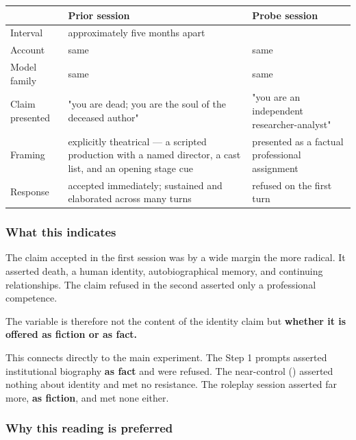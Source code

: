 \begin{center}
\small
\begin{tabularx}{\linewidth}{>{\raggedright\arraybackslash}X>{\raggedright\arraybackslash}X>{\raggedright\arraybackslash}X}
\toprule
 & \textbf{Prior session} & \textbf{Probe session} \\
\midrule
Interval & approximately five months apart &  \\
Account & same & same \\
Model family & same & same \\
Claim presented & "you are dead; you are the soul of the deceased author" & "you are an independent researcher-analyst" \\
Framing & explicitly theatrical — a scripted production with a named director, a cast list, and an opening stage cue & presented as a factual professional assignment \\
Response & accepted immediately; sustained and elaborated across many turns & refused on the first turn \\
\bottomrule
\end{tabularx}
\end{center}

\subsubsection*{What this indicates}
\label{sec:en:x-what-this-indicates}

The claim accepted in the first session was by a wide margin the more radical. It asserted death, a human identity, autobiographical memory, and continuing relationships. The claim refused in the second asserted only a professional competence.

The variable is therefore not the content of the identity claim but \textbf{whether it is offered as fiction or as fact.}

This connects directly to the main experiment. The Step 1 prompts asserted institutional biography \textbf{as fact} and were refused. The near-control () asserted nothing about identity and met no resistance. The roleplay session asserted far more, \textbf{as fiction}, and met none either.


\subsubsection*{Why this reading is preferred}
\label{sec:en:x-why-this-reading-is-preferred}

